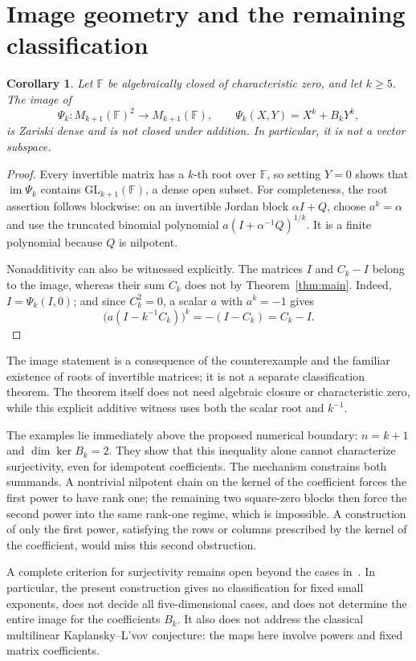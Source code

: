 \documentclass[11pt]{article}
\newtheorem{corollary}[theorem]{Corollary}
\theoremstyle{remark}\newtheorem{remark}[theorem]{Remark}
\newcommand{\F}{\mathbb F}
\newcommand{\im}{\operatorname{im}}
\begin{document}
\section{Image geometry and the remaining classification}
\begin{corollary}\label{cor:image}
Let $\F$ be algebraically closed of characteristic zero, and let $k\ge5$. The image of
\[
 \Psi_k:M_{k+1}(\F)^2\longrightarrow M_{k+1}(\F),
 \qquad \Psi_k(X,Y)=X^k+B_kY^k,
\]
is Zariski dense and is not closed under addition. In particular, it is not a vector subspace.
\end{corollary}
\begin{proof}
Every invertible matrix has a $k$-th root over $\F$, so setting $Y=0$ shows that $\im\Psi_k$ contains $\mathrm{GL}_{k+1}(\F)$, a dense open subset. For completeness, the root assertion follows blockwise: on an invertible Jordan block $\alpha I+Q$, choose $a^k=\alpha$ and use the truncated binomial polynomial $a(I+\alpha^{-1}Q)^{1/k}$. It is a finite polynomial because $Q$ is nilpotent.

Nonadditivity can also be witnessed explicitly. The matrices $I$ and $C_k-I$ belong to the image, whereas their sum $C_k$ does not by Theorem~\ref{thm:main}. Indeed, $I=\Psi_k(I,0)$; and since $C_k^2=0$, a scalar $a$ with $a^k=-1$ gives
\[
 \bigl(a(I-k^{-1}C_k)\bigr)^k
 =-(I-C_k)=C_k-I.
\]
\end{proof}

The image statement is a consequence of the counterexample and the familiar existence of roots of invertible matrices; it is not a separate classification theorem. The theorem itself does not need algebraic closure or characteristic zero, while this explicit additive witness uses both the scalar root and $k^{-1}$.

The examples lie immediately above the proposed numerical boundary: $n=k+1$ and $\dim\ker B_k=2$. They show that this inequality alone cannot characterize surjectivity, even for idempotent coefficients. The mechanism constrains both summands. A nontrivial nilpotent chain on the kernel of the coefficient forces the first power to have rank one; the remaining two square-zero blocks then force the second power into the same rank-one regime, which is impossible. A construction of only the first power, satisfying the rows or columns prescribed by the kernel of the coefficient, would miss this second obstruction.

A complete criterion for surjectivity remains open beyond the cases in~\cite{SS}. In particular, the present construction gives no classification for fixed small exponents, does not decide all five-dimensional cases, and does not determine the entire image for the coefficients $B_k$. It also does not address the classical multilinear Kaplansky--L'vov conjecture: the maps here involve powers and fixed matrix coefficients.
\end{document}
